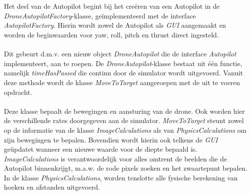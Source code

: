 \\
\\
Het deel van de Autopilot begint bij het cre\"eren van een Autopilot in de \textit{DroneAutopilotFactory}-klasse, ge\"implementeerd met de interface \textit{AutopilotFactory}. Hierin wordt zowel de Autopilot als \textit{GUI} aangemaakt en worden de beginwaarden voor yaw, roll, pitch en thrust direct ingesteld. 
\\
\\
Dit gebeurt d.m.v. een nieuw object \textit{DroneAutopilot} die de interface \textit{Autopilot} implementeert, aan te roepen. De \textit{DroneAutopilot}-klasse bestaat uit één functie, namelijk \textit{timeHasPassed} die continu door de simulator wordt uitgevoerd. Vanuit deze methode wordt de klasse \textit{MoveToTarget} aangeroepen met de uit te voeren opdracht.
\\
\\
Deze klasse bepaalt de bewegingen en aansturing van de drone. Ook worden hier de verschillende rates doorgegeven aan de simulator. \textit{MoveToTarget} steunt zowel op de informatie van de klasse \textit{ImageCalculations} als van \textit{PhysicsCalculations} om zijn bewegingen te bepalen. Bovendien wordt hierin ook telkens de \textit{GUI} ge\"updatet wanneer een nieuwe waarde voor de diepte bepaald is.
\\
\textit{ImageCalculations} is verantwoordelijk voor alles omtrent de beelden die de Autopilot binnenkrijgt, m.a.w. de rode pixels zoeken en het zwaartepunt bepalen.
In de klasse \textit{PhysicsCalculations}, worden tenslotte alle fysische berekening van hoeken en afstanden uitgevoerd.
